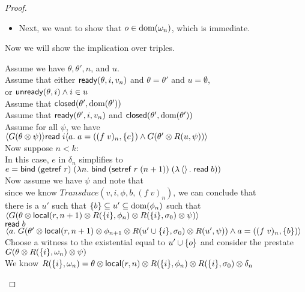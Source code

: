 \begin{proof}
\begin{itemize}
\item Next, we want to show that $o \in \mbox{dom}({\omega_n})$, which is immediate. 
\end{itemize}

Now we will show the implication over triples. 
\begin{tabbedproof}
\oo Assume we have $\theta, \theta', n$, and $u$. \\
\oo Assume that either $\mathsf{ready}({\theta}, {i}, {v_n})$ and $\theta = \theta'$ and $u = \emptyset$,  \\
\oo or $\mathsf{unready}({\theta}, {i}) \land i \in u$ \\
\oo Assume that $\mathsf{closed}({\theta'}, {\mbox{dom}({\theta'})})$ \\
\oo Assume that $\mathsf{ready}({\theta'}, {i}, {v_n})$ and $\mathsf{closed}({\theta'}, {\mbox{dom}({\theta'})})$ \\
\oo Assume for all $\psi$, we have \\
\ox  $\langle{G(\theta \otimes \psi)}\rangle{\mathsf{read}\;i}\langle{a}.\;{a = ((f\;v)_n, \{{c}\}) 
      \land G(\theta' \otimes R(u,\psi)) }\rangle$ \\
\oo Now suppose $n < k$: \\
\ooo In this case, $e$ in $\delta_n$ simplifies to \\
\oooo $e = \mathsf{bind}\; (\mathsf{getref}\; r)\; (\lambda n.\;\mathsf{bind}\; (\mathsf{setref}\; r\;(n+1))\; (\lambda \left<\right>.\;\mathsf{read}\; b))$ \\
\ooo Now assume we have $\psi$ and note that  \\
\oooo since we know $\mathit{Transduce}(v, i, \phi, b, (f\;v)_n)$, we can conclude that \\
\oooo there is a $u'$ such that $\{{b}\} \subseteq u' \subseteq \mbox{dom}({\phi_n})$ such that \\
\oooo $\left<G(\theta \otimes \mathsf{local}({r}, {n+1}) \otimes R(\{{i}\}, \phi_n) \otimes R(\{{i}\}, \sigma_0) \otimes \psi)\right>$ \\
\oooo $\mathsf{read}\; b$\\
\oooo $\left<a.\;G(\theta' \otimes \mathsf{local}({r}, {n+1}) \otimes \phi_{n+1} \otimes R(u' \cup \{{i}\}, \sigma_0) \otimes R(u', \psi))
      \land a = ((f\;v)_n, \{{b}\})\right>$ \\
\ooo Choose a witness to the existential equal to $u' \cup \{{o}\}$ and consider the prestate \\
\ooo $G(\theta \otimes R(\{{i}\}, \omega_n) \otimes \psi)$ \\
\ooo We know $R(\{{i}\}, \omega_n) = \theta \otimes \mathsf{local}({r}, {n}) \otimes R(\{{i}\}, \phi_n) \otimes R(\{{i}\}, \sigma_0) \otimes \delta_n$ \\

\end{tabbedproof}
\end{proof}
